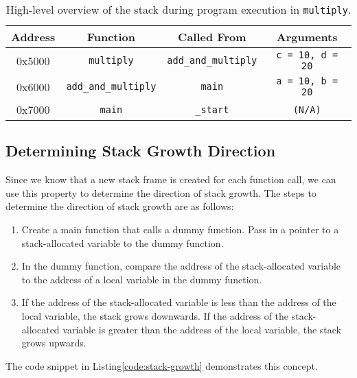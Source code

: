 \documentclass[main.tex]{subfiles}
\begin{document}
\begin{table}[H]
    \centering
    \begin{tabular}{|c|c|c|c|}
    \hline
    \textbf{Address} & \textbf{Function}            & \textbf{Called From}   & \textbf{Arguments}        \\ \hline
    0x5000           & \texttt{multiply}           & \texttt{add\_and\_multiply} & \texttt{c = 10, d = 20}   \\ \hline
    0x6000           & \texttt{add\_and\_multiply} & \texttt{main}           & \texttt{a = 10, b = 20}   \\ \hline
    0x7000           & \texttt{main}               & \texttt{\_start}        & \texttt{(N/A)}            \\ \hline
    \end{tabular}
    \caption{High-level overview of the stack during program execution in \texttt{multiply}.}
    \label{table:stack_overview}
\end{table}

\subsection{Determining Stack Growth Direction}
Since we know that a new stack frame is created for each function call, we can use this property to determine the direction of stack growth. The steps to determine the direction of stack growth are as follows:
\begin{enumerate}
    \item Create a main function that calls a dummy function. Pass in a pointer to a stack-allocated variable to the dummy function.
    \item In the dummy function, compare the address of the stack-allocated variable to the address of a local variable in the dummy function.
    \item If the address of the stack-allocated variable is less than the address of the local variable, the stack grows downwards. If the address of the stack-allocated variable is greater than the address of the local variable, the stack grows upwards.
\end{enumerate}
\noindent The code snippet in Listing\ref{code:stack-growth} demonstrates this concept.


    
\end{document}
